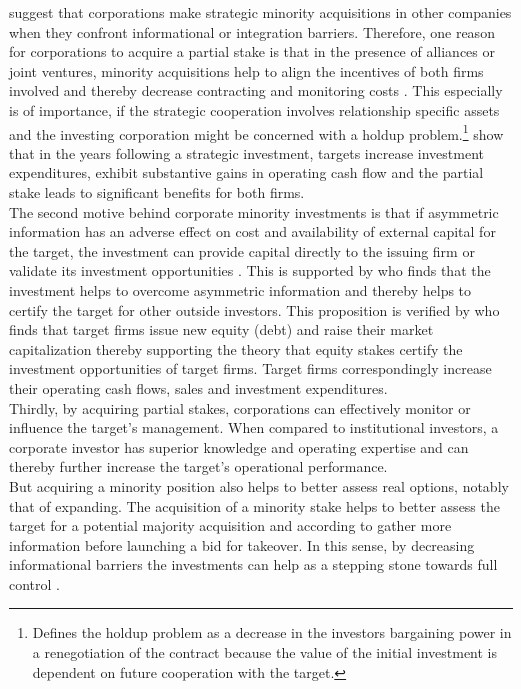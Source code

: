\documentclass[12pt]{article}
\begin{document}
\citet[p.1]{Huang2017} suggest that corporations make strategic minority acquisitions in other companies when they confront informational or integration barriers. 
Therefore, one reason for corporations to acquire a partial stake is that in the presence of alliances or joint ventures, minority acquisitions help to align the incentives of both firms involved and thereby decrease contracting and monitoring costs \citep[p.2792]{Allen2000}. This especially is of importance, if the strategic cooperation involves relationship specific assets and the investing corporation might be concerned with a holdup problem.\footnote{\citet[p.1023]{Ouimet2013} Defines the holdup problem as a decrease in the investors bargaining power in a renegotiation of the contract because the value of the initial investment is dependent on future cooperation with the target.} \citet[p. 2793]{Allen2000} show that in the years following a strategic investment,  targets increase investment expenditures, exhibit substantive gains in operating cash flow and the partial stake leads to significant benefits for both firms.\\
The second motive behind corporate minority investments is that if asymmetric information has an adverse effect on cost and availability of external capital for the target, the investment can provide capital directly to the issuing firm or validate its investment opportunities \citep[p. 2792]{Allen2000}. This is supported by \citet[p.1038]{Ouimet2013} who finds that the investment helps to overcome asymmetric information and thereby helps to certify the target for other outside investors. This proposition is verified by \citet[p.78]{Liao2014} who finds that target firms issue new equity (debt) and raise their market capitalization thereby supporting the theory that equity stakes certify the investment opportunities of target firms. Target firms correspondingly increase their operating cash flows, sales and investment expenditures.\\
Thirdly, by acquiring partial stakes, corporations can effectively monitor or influence the target's management. When compared to institutional investors, a corporate investor has superior knowledge and operating expertise \citep[p.2792]{Allen2000} and can thereby further increase the target's operational performance.\\
But acquiring a minority position also helps to better assess real options, notably that of expanding. The acquisition of a minority stake helps to better assess the target for a potential majority acquisition \citep{Ouimet2013} and according to \citet[p.30]{Huang2017} gather more information before launching a bid for takeover. In this sense, by decreasing informational barriers the investments can help as a stepping stone towards full control \citep[p.3]{Huang2017}.\\
\end{document}
